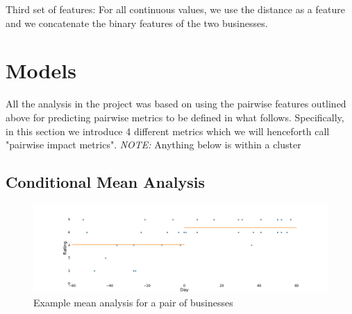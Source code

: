 \documentclass{vldb}
\begin{document}
Third set of features: For all continuous values, we use the distance as a feature and we concatenate the binary features of the two businesses.


\section{Models}
All the analysis in the project was based on using the pairwise features outlined above for predicting pairwise metrics to be defined in what follows.
Specifically, in this section we introduce 4 different metrics which we will henceforth call "pairwise impact metrics".
\textit{NOTE:} Anything below is within a cluster



\subsection*{Conditional Mean Analysis}

\begin{figure}[h]
\centering
\includegraphics[width=\columnwidth]{mean.pdf}
\caption{Example mean analysis for a pair of businesses}
\end{figure}
\end{document}
